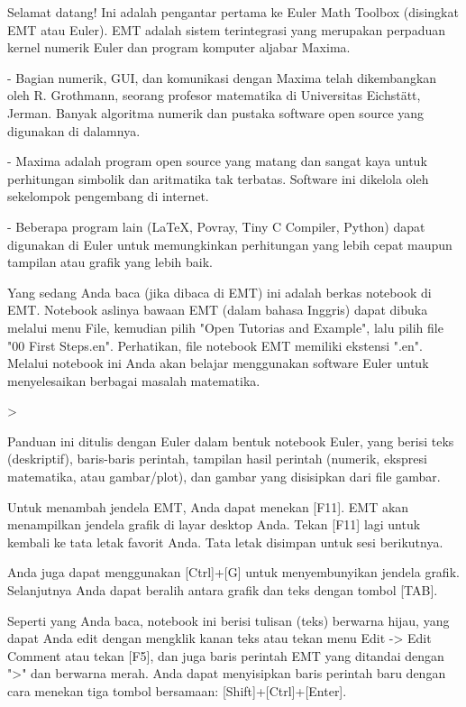 \documentclass{report}
\begin{document}
\begin{eulernotebook}
\begin{eulercomment}
Selamat datang! Ini adalah pengantar pertama ke Euler Math Toolbox
(disingkat EMT atau Euler). EMT adalah sistem terintegrasi yang
merupakan perpaduan kernel numerik Euler dan program komputer aljabar
Maxima.

- Bagian numerik, GUI, dan komunikasi dengan Maxima telah dikembangkan
oleh R. Grothmann, seorang profesor matematika di Universitas
Eichstätt, Jerman. Banyak algoritma numerik dan pustaka software open
source yang digunakan di dalamnya.

- Maxima adalah program open source yang matang dan sangat kaya untuk
perhitungan simbolik dan aritmatika tak terbatas. Software ini
dikelola oleh sekelompok pengembang di internet.

- Beberapa program lain (LaTeX, Povray, Tiny C Compiler, Python) dapat
digunakan di Euler untuk memungkinkan perhitungan yang lebih cepat
maupun tampilan atau grafik yang lebih baik.

Yang sedang Anda baca (jika dibaca di EMT) ini adalah berkas notebook
di EMT. Notebook aslinya bawaan EMT (dalam bahasa Inggris) dapat
dibuka melalui menu File, kemudian pilih "Open Tutorias and Example",
lalu pilih file "00 First Steps.en". Perhatikan, file notebook EMT
memiliki ekstensi ".en". Melalui notebook ini Anda akan belajar
menggunakan software Euler untuk menyelesaikan berbagai masalah
matematika.
\end{eulercomment}
\begin{eulerprompt}
> 
\end{eulerprompt}
\begin{eulercomment}
Panduan ini ditulis dengan Euler dalam bentuk notebook Euler, yang
berisi teks (deskriptif), baris-baris perintah, tampilan hasil
perintah (numerik, ekspresi matematika, atau gambar/plot), dan gambar
yang disisipkan dari file gambar.

Untuk menambah jendela EMT, Anda dapat menekan [F11]. EMT akan
menampilkan jendela grafik di layar desktop Anda. Tekan [F11] lagi
untuk kembali ke tata letak favorit Anda. Tata letak disimpan untuk
sesi berikutnya.

Anda juga dapat menggunakan [Ctrl]+[G] untuk menyembunyikan jendela
grafik. Selanjutnya Anda dapat beralih antara grafik dan teks dengan
tombol [TAB].

Seperti yang Anda baca, notebook ini berisi tulisan (teks) berwarna
hijau, yang dapat Anda edit dengan mengklik kanan teks atau tekan menu
Edit -\textgreater{} Edit Comment atau tekan [F5], dan juga baris perintah EMT yang
ditandai dengan "\textgreater{}" dan berwarna merah. Anda dapat menyisipkan baris
perintah baru dengan cara menekan tiga tombol bersamaan:
[Shift]+[Ctrl]+[Enter].



\end{eulercomment}
\end{eulernotebook}
\end{document}
